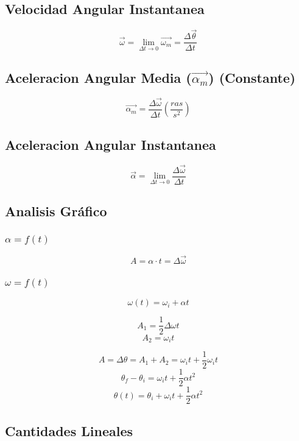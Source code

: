 \documentclass[11pt]{article}
\begin{document}
\subsection{Velocidad Angular Instantanea}
\[\vec{\omega} = \lim_{{\Delta}t \to 0} \vec{\omega_m} = \frac{\Delta \vec{\theta}}{\Delta t} \]

\subsection{Aceleracion Angular Media ($\vec{\alpha_m} $) (Constante)}
\[\vec{\alpha_m} = \frac{\Delta \vec{\omega}}{\Delta t} (\frac{ras}{s^2})\]

\subsection{Aceleracion Angular Instantanea}
\[\vec{\alpha}= \lim_{\Delta t \to 0} \frac{\Delta \vec{\omega}}{\Delta t} \]

\subsection{Analisis Gráfico} 
\subsubsection{$\alpha = f(t)$}
\[A = \alpha \cdot t = \Delta \vec{\omega} \]

\subsubsection{$\omega = f(t)$}
\[\omega(t) = \omega_i + \alpha t \]

\[A_1 = \frac{1}{2} \Delta\omega t \]
\[A_2 = \omega_i t \]

\[A = \Delta\theta = A_1 + A_2 = \omega_i t + \frac{1}{2}\omega_i t \] 
\[\theta_f - \theta_i = \omega_i t + \frac{1}{2}\alpha t^2 \]
\[\theta(t) = \theta_i + \omega_i t + \frac{1}{2}\alpha t^2 \]

\subsection{Cantidades Lineales}
\end{document}
